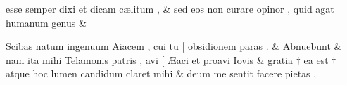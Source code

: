 \documentclass[12pt,onecolumn,twoside,a4paper]{memoir}
\begin{document}
\begin{pairs}
\begin{Leftside}
                              esse
                              semper
                              dixi
                              et
                              dicam
                              cælitum
                              , & 
                     sed
                              eos
                              non
                              curare
                              opinor
                              ,
                              quid
                              agat
                              humanum
                              genus \&
                         \stanza {}
                     
                              Scibas
                              natum
                              ingenuum
                              Aiacem
                              ,
                              cui
                              tu
                              [
                              obsidionem
                              paras
                              . \&
                         \stanza {}
                     Abnuebunt \&
                         \stanza {}nam
                              ita
                              mihi
                              Telamonis
                              patris
                              ,
                              avi
                              [
                              Æaci
                              et
                              proavi
                              Iovis & 
                     gratia
                              †
                              ea
                              est
                              †
                              atque
                              hoc
                              lumen
                              candidum
                              claret
                              mihi \&
                         \stanza {}
                     deum
                              me
                              sentit
                              facere
                              pietas
                              ,

\end{Leftside}
\end{pairs}
\end{document}
